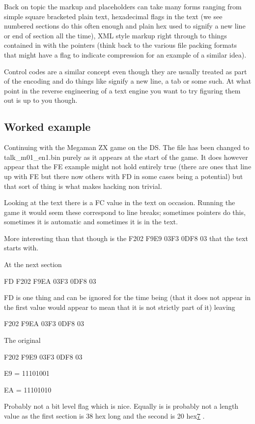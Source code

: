 \documentclass[
]{book}
\begin{document}
Back on topic the markup and placeholders can take many forms ranging from simple square bracketed plain text, hexadecimal flags in the text (we see numbered sections do this often enough and plain hex used to signify a new line or end of section all the time), XML style markup right through to things contained in with the pointers (think back to the various file packing formats that might have a flag to indicate compression for an example of a similar idea).

Control codes are a similar concept even though they are usually treated as part of the encoding and do things like signify a new line, a tab or some such. At what point in the reverse engineering of a text engine you want to try figuring them out is up to you though.

\hypertarget{worked-example}{%
\subsection{Worked example}\label{worked-example}}

Continuing with the Megaman ZX game on the DS. The file has been changed to talk\_m01\_en1.bin purely as it appears at the start of the game. It does however appear that the FE example might not hold entirely true (there are ones that line up with FE but there now others with FD in some cases being a potential) but that sort of thing is what makes hacking non trivial.

Looking at the text there is a FC value in the text on occasion. Running the game it would seem these correspond to line breaks; sometimes pointers do this, sometimes it is automatic and sometimes it is in the text.

More interesting than that though is the F202 F9E9 03F3 0DF8 03 that the text starts with.

At the next section

FD F202 F9EA 03F3 0DF8 03

FD is one thing and can be ignored for the time being (that it does not appear in the first value would appear to mean that it is not strictly part of it) leaving

F202 F9EA 03F3 0DF8 03

The original

F202 F9E9 03F3 0DF8 03

E9 = 11101001

EA = 11101010

Probably not a bit level flag which is nice. Equally is is probably not a length value as the first section is 38 hex long and the second is 20 hex\href{romhacking20208.html\#fn7x0}{7} .
\end{document}

